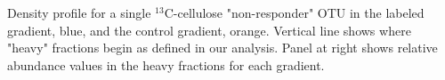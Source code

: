 Density profile for a single $^13$C-cellulose "non-responder" OTU in the labeled gradient, blue, and the control gradient, orange. Vertical line shows where "heavy" fractions begin as defined in our analysis. Panel at right shows relative abundance values in the heavy fractions for each gradient.